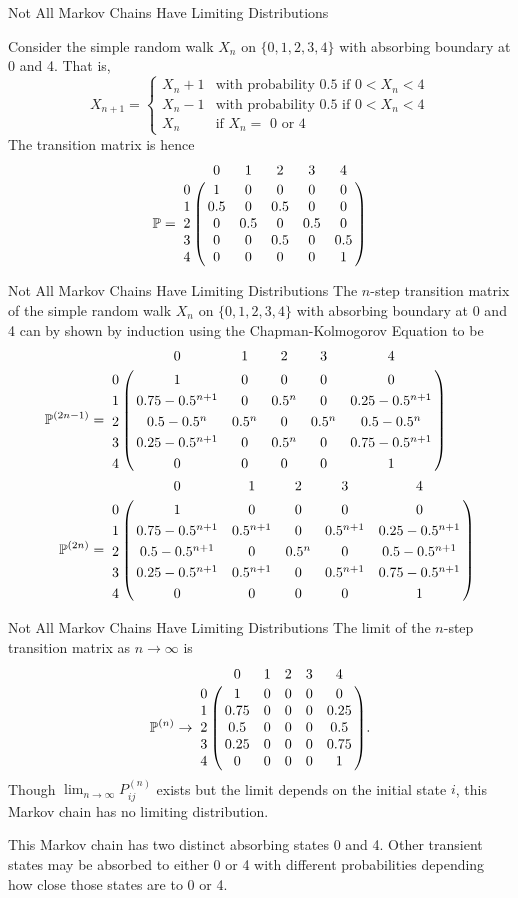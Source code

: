 \documentclass[letterpaper,handout]{beamer}
\def\P{\mathbb{P}}
\begin{document}
\begin{frame}{Not All Markov Chains Have Limiting Distributions}

Consider the simple random walk $X_n$ on $\{0,1,2,3,4\}$ with absorbing boundary at 0 and 4. That is,
\[
X_{n+1}
=\begin{cases}
X_n+1 &\text{with probability 0.5 if } 0<X_n <4\\
X_n-1 &\text{with probability 0.5 if } 0<X_n <4\\
X_n & \text{if $X_n=$ 0 or 4}
\end{cases}
\]
The transition matrix is hence
{\small
\[
\P=
\bordermatrix{%
  &  0  &  1  &  2  &  3  &  4 \cr
0 &  1  &  0  &  0  &  0  &  0 \cr
1 & 0.5 &  0  & 0.5 &  0  &  0 \cr
2 &  0  & 0.5 &  0  & 0.5 &  0 \cr
3 &  0  &  0  & 0.5 &  0  & 0.5\cr
4 &  0  &  0  &  0  &  0  &  1
}
\]}
\end{frame}
\begin{frame}{Not All Markov Chains Have Limiting Distributions}\linespread{1.1}
The $n$-step transition matrix of the simple random walk $X_n$ on $\{0,1,2,3,4\}$ with absorbing boundary at 0 and 4
can by shown by induction using the Chapman-Kolmogorov Equation to be
{\small
\begin{align*}
\P^{(2n-1)}&=
\bordermatrix{%
  &  0  &  1  &  2  &  3  &  4 \cr
0 &  1  &  0  &  0  &  0  &  0 \cr
1 & 0.75-0.5^{n+1} &  0  & 0.5^n &  0  & 0.25-0.5^{n+1}\cr
2 & 0.5-0.5^n & 0.5^n &  0  & 0.5^n & 0.5-0.5^n\cr
3 & 0.25-0.5^{n+1}  &  0  & 0.5^n &  0  & 0.75-0.5^{n+1}\cr
4 &  0  &  0  &  0  &  0  &  1
}\\
\P^{(2n)}&=
\bordermatrix{%
  &  0  &  1  &  2  &  3  &  4 \cr
0 &  1  &  0  &  0  &  0  &  0 \cr
1 & 0.75-0.5^{n+1} & 0.5^{n+1} &  0 & 0.5^{n+1} & 0.25-0.5^{n+1}\cr
2 & 0.5 -0.5^{n+1} &  0  & 0.5^n & 0 & 0.5-0.5^{n+1}\cr
3 & 0.25-0.5^{n+1} & 0.5^{n+1} &  0 & 0.5^{n+1} & 0.75-0.5^{n+1}\cr
4 &  0  &  0  &  0  &  0  &  1
}
\end{align*}}
\end{frame}
\begin{frame}{Not All Markov Chains Have Limiting Distributions}
The limit of the $n$-step transition matrix as $n\to\infty$ is
$$
\P^{(n)}\to
\bordermatrix{%
  &  0   &  1  &  2  &  3  &  4 \cr
0 &  1   &  0  &  0  &  0  &  0 \cr
1 & 0.75 &  0  &  0  &  0  & 0.25\cr
2 & 0.5  &  0  &  0  &  0  & 0.5\cr
3 & 0.25 &  0  &  0  &  0  & 0.75\cr
4 &  0   &  0  &  0  &  0  &  1
}.
$$
Though $\lim_{n\to\infty}P^{(n)}_{ij}$ exists but the limit depends on the initial state $i$,
this Markov chain has no limiting distribution.\medskip

This Markov chain has two distinct absorbing states 0 and 4.
Other transient states may be absorbed to either 0 or 4 with
different probabilities depending how close those states are to 0 or 4.
\end{frame}
\end{document}
